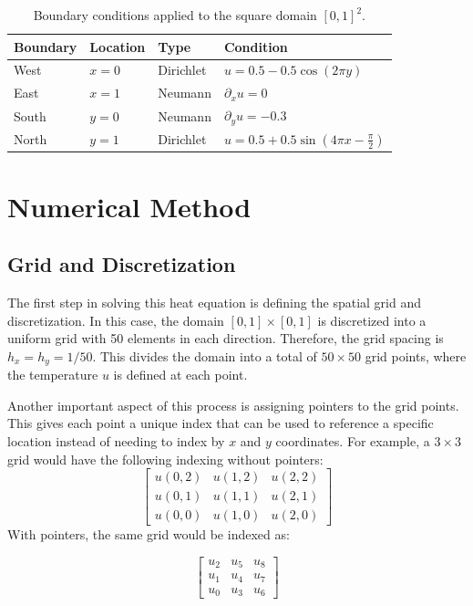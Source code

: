 \documentclass[
  aapm,
  amsmath,amssymb,
  reprint,          %
  floatfix
]{revtex4-2}
\begin{document}
\begin{table}[h]
  \centering
  \caption{Boundary conditions applied to the square domain $[0,1]^2$.}
  \label{tab:bc}
  \begin{tabular}{llll}
  \hline\hline
  Boundary & Location & Type & Condition \\
  \hline
  West  & $x = 0$ & Dirichlet & $u = 0.5 - 0.5\cos(2\pi y)$ \\
  East  & $x = 1$ & Neumann   & $\partial_x u = 0$ \\
  South & $y = 0$ & Neumann   & $\partial_y u = -0.3$ \\
  North & $y = 1$ & Dirichlet & $u = 0.5 + 0.5\sin\!\left(4\pi x - \tfrac{\pi}{2}\right)$ \\
  \hline\hline
  \end{tabular}
  \end{table}

\section{Numerical Method}
\subsection{Grid and Discretization}

The first step in solving this heat equation is defining the spatial grid and discretization.
In this case, the domain $[0,1]\times[0,1]$ is discretized into a uniform grid with 50 elements
in each direction. Therefore, the grid spacing is $h_x = h_y = 1/50$. This divides the domain
into a total of $50\times 50$ grid points, where the temperature $u$ is defined at each point. 

Another important aspect of this process is assigning pointers to the grid points. This gives 
each point a unique index that can be used to reference a specific location instead of needing
to index by $x$ and $y$ coordinates. For example, a $3\times 3$ grid would have the following 
indexing without pointers:
\begin{equation}
\begin{bmatrix}
u(0,2) & u(1,2) & u(2,2) \\
u(0,1) & u(1,1) & u(2,1) \\
u(0,0) & u(1,0) & u(2,0)
\end{bmatrix}
\end{equation}
With pointers, the same grid would be indexed as:

\begin{equation}
\begin{bmatrix}
u_2 & u_5 & u_8 \\
u_1 & u_4 & u_7 \\
u_0 & u_3 & u_6
\end{bmatrix}
\end{equation}
\end{document}
